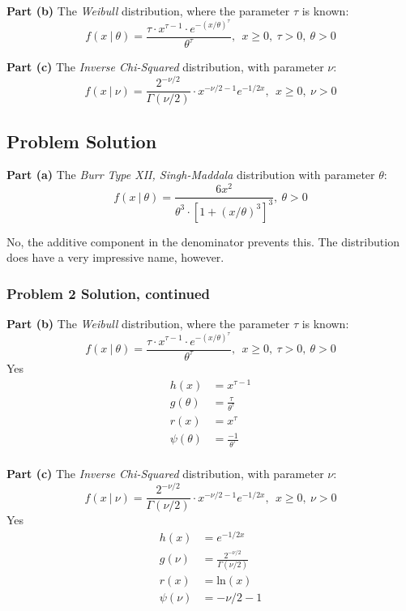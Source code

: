 \documentclass[12pt]{article}
\theoremstyle{definition}
\begin{document}
\bigskip
\noindent
{\bf Part (b)} The {\em Weibull} distribution, where the parameter $\tau$ is known:
$$
f(x\ |\ \theta) = \frac{ \tau \cdot x^{\tau - 1} \cdot e^{-(x/\theta)^\tau}}{\theta^\tau},\ \ x \geq 0,\ \tau > 0,\ \theta > 0
$$



\bigskip
\noindent
{\bf Part (c)} The {\em Inverse Chi-Squared} distribution, with parameter $\nu$:
$$
f(x\ |\ \nu) = \frac{ 2^{-\nu/2} }{\Gamma( \nu / 2)} \cdot x^{-\nu/2 - 1} e^{-1/2x},\ \ x \geq 0,\ \nu > 0
$$


\subsection*{Problem Solution}

\noindent
{\bf Part (a)} The {\em Burr Type XII, Singh-Maddala} distribution with parameter $\theta$:
$$
f(x\ |\ \theta) = \frac{ 6 x^2 }{\theta^3 \cdot [1 + (x/\theta)^3]^3},\ \theta > 0
$$

No, the additive component in the denominator prevents this. The distribution does have a very impressive name, however.
\bigskip

\newpage
\subsubsection*{Problem 2 Solution, continued}

\noindent
{\bf Part (b)} The {\em Weibull} distribution, where the parameter $\tau$ is known:
$$
f(x\ |\ \theta) = \frac{ \tau \cdot x^{\tau - 1} \cdot e^{-(x/\theta)^\tau}}{\theta^\tau},\ \ x \geq 0,\ \tau > 0,\ \theta > 0
$$
Yes
\begin{align*}
h(x) &= x^{\tau - 1}\\
g(\theta) &= \frac{\tau}{\theta^\tau}\\
r(x) &= x^\tau\\
\psi(\theta) &= \frac{{-1}}{\theta^\tau}\\
\end{align*}


\vspace{3in}
\noindent
{\bf Part (c)} The {\em Inverse Chi-Squared} distribution, with parameter $\nu$:
$$
f(x\ |\ \nu) = \frac{ 2^{-\nu/2} }{\Gamma( \nu / 2)} \cdot x^{-\nu/2 - 1} e^{-1/2x},\ \ x \geq 0,\ \nu > 0
$$
Yes
\begin{align*}
h(x) &= e^{-1/2x}\\
g(\nu) &=  \frac{ 2^{-\nu/2} }{\Gamma( \nu / 2)}\\
r(x) &= \text{ln}(x)\\
\psi(\nu) &= {-\nu/2 - 1}\\
\end{align*}
\end{document}
